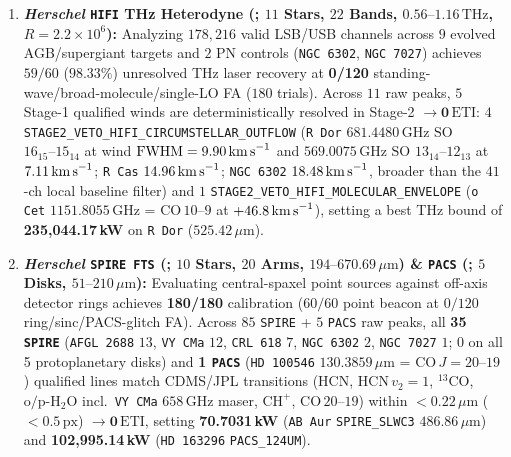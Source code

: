 \documentclass[twocolumn,10pt]{article}
\begin{document}
\begin{enumerate}
  \item \textbf{\textit{Herschel} \texttt{HIFI} THz Heterodyne (\cite{Pilbratt2010,deGraauw2010}; $11$ Stars, $22$ Bands, $0.56\text{--}1.16\,\text{THz}$, $R = 2.2\times 10^6$):} Analyzing $178{,}216$ valid LSB/USB channels across $9$ evolved AGB/supergiant targets and $2$ PN controls (\texttt{NGC\,6302}, \texttt{NGC\,7027}) achieves $59/60$ ($98.33\%$) unresolved THz laser recovery at \textbf{0/120} standing-wave/broad-molecule/single-LO FA ($180$ trials). Across $11$ raw peaks, $5$ Stage-1 qualified winds are deterministically resolved in Stage-2 $\rightarrow \mathbf{0\,\mathrm{ETI}}$: $4$ \texttt{STAGE2\_VETO\_HIFI\_CIRCUMSTELLAR\_OUTFLOW} (\texttt{R\,Dor} $681.4480\,\text{GHz}$ $\mathrm{SO}$ $16_{15}\text{--}15_{14}$ at wind $\mathrm{FWHM}=9.90\,\text{km\,s}^{-1}$ and $569.0075\,\text{GHz}$ $\mathrm{SO}$ $13_{14}\text{--}12_{13}$ at $7.11\,\text{km\,s}^{-1}$; \texttt{R\,Cas} $14.96\,\text{km\,s}^{-1}$; \texttt{NGC\,6302} $18.48\,\text{km\,s}^{-1}$, broader than the $41$-ch local baseline filter) and $1$ \texttt{STAGE2\_VETO\_HIFI\_MOLECULAR\_ENVELOPE} (\texttt{o\,Cet} $1151.8055\,\text{GHz}$ = $\mathrm{CO}\,10\text{--}9$ at $+46.8\,\text{km\,s}^{-1}$), setting a best THz bound of \textbf{235,044.17\,kW} on \texttt{R\,Dor} ($525.42\,\mu\text{m}$).
  \item \textbf{\textit{Herschel} \texttt{SPIRE FTS} (\cite{Griffin2010}; $10$ Stars, $20$ Arms, $194\text{--}670.69\,\mu\text{m}$) \& \texttt{PACS} (\cite{Poglitsch2010}; $5$ Disks, $51\text{--}210\,\mu\text{m}$):} Evaluating central-spaxel point sources against off-axis detector rings achieves \textbf{180/180} calibration ($60/60$ point beacon at $0/120$ ring/sinc/PACS-glitch FA). Across $85$ \texttt{SPIRE} + $5$ \texttt{PACS} raw peaks, all \textbf{35 \texttt{SPIRE}} (\texttt{AFGL\,2688} $13$, \texttt{VY\,CMa} $12$, \texttt{CRL\,618} $7$, \texttt{NGC\,6302} $2$, \texttt{NGC\,7027} $1$; $0$ on all 5 protoplanetary disks) and \textbf{1 \texttt{PACS}} (\texttt{HD\,100546} $130.3859\,\mu\text{m}$ = $\mathrm{CO}\,J=20\text{--}19$) qualified lines match CDMS/JPL transitions ($\mathrm{HCN}$, $\mathrm{HCN}\,v_2=1$, $\mathrm{^{13}CO}$, $\mathrm{o/p\text{-}H_2O}$ incl.\ \texttt{VY\,CMa} $658\,\text{GHz}$ maser, $\mathrm{CH^+}$, $\mathrm{CO\,20\text{--}19}$) within $<0.22\,\mu\text{m}$ ($<0.5\,\text{px}$) $\rightarrow \mathbf{0\,\mathrm{ETI}}$, setting \textbf{70.7031\,kW} (\texttt{AB\,Aur} \texttt{SPIRE\_SLWC3} $486.86\,\mu\text{m}$) and \textbf{102,995.14\,kW} (\texttt{HD\,163296} \texttt{PACS\_124UM}).

\end{enumerate}
\end{document}

